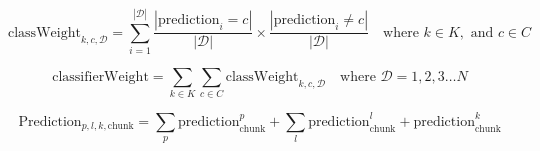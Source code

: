 \begin{equation}
	\label{eq:6_eq_1}
	\text{classWeight}_{k,c,\mathcal{D}} = \sum_{i=1}^{|\mathcal{D}|} \frac{|\text{prediction}_i = c|}{|\mathcal{D}|} \times \frac{|\text{prediction}_i \neq c|}{|\mathcal{D}|} \quad \text{where } k \in K, \text{ and } c \in C
\end{equation}

\begin{equation}
	\label{eq:6_eq_2}
	\text{classifierWeight} = \sum_{k \in K} \sum_{c \in C} \text{classWeight}_{k,c,\mathcal{D}} \quad \text{where } \mathcal{D} = 1,2,3 \dots N
\end{equation}

\begin{equation}
	\label{eq:6_eq_3}
    \text{Prediction}_{p,l,k,\text{chunk}} = \sum_{p} \text{prediction}^{p}_{\text{chunk}} + \sum_{l} \text{prediction}^{l}_{\text{chunk}} + \text{prediction}^{k}_{\text{chunk}}
\end{equation}

